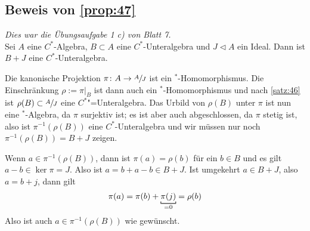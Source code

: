 \subsection{Beweis von \autoref{prop:47}} %
\label{sub:beweis_von_prop_47}
\emph{Dies war die Übungsaufgabe 1 c) von Blatt 7.}\smallskip\\
Sei $A$ eine $C^*$-Algebra, $B \subset A$ eine $C^*$-Unteralgebra und $J \lhd A$ ein Ideal.
Dann ist $B + J$ eine $C^*$-Unteralgebra.
\begin{beweis}
	Die kanonische Projektion $\pi \colon A \to \sfrac{A}{J}$ ist ein $^*$-Homomorphismus.
	Die Einschränkung $\rho := \pi|_B$ ist dann auch ein $^*$-Homomorphismus und nach \autoref{satz:46} ist $\rho(B) \subset \sfrac{A}{J}$ eine $C^*$"=Unteralgebra.
	Das Urbild von $\rho(B)$ unter $\pi$ ist nun eine $^*$-Algebra, da $\pi$ surjektiv ist; es ist aber auch abgeschlossen, da $\pi$ stetig ist, also ist $\pi^{-1}(\rho(B))$ eine $C^*$-Unteralgebra und wir müssen nur noch $\pi^{-1}(\rho(B))= B+J$ zeigen.
	
	Wenn $a \in \pi^{-1}(\rho(B))$, dann ist $\pi(a)=\rho(b)$ für ein $b \in B$ und es gilt $a-b \in \ker \pi=J$.
	Also ist $a=b+a-b \in B+ J$.
	Ist umgekehrt $a \in B+J$, also $a=b+j$, dann gilt
	\[
		\pi(a) = \pi(b) + \Underbracket{\pi(j)}{=0} = \rho(b)
	\]
	Also ist auch $a \in \pi^{-1}(\rho(B))$ wie gewünscht.
\end{beweis}

